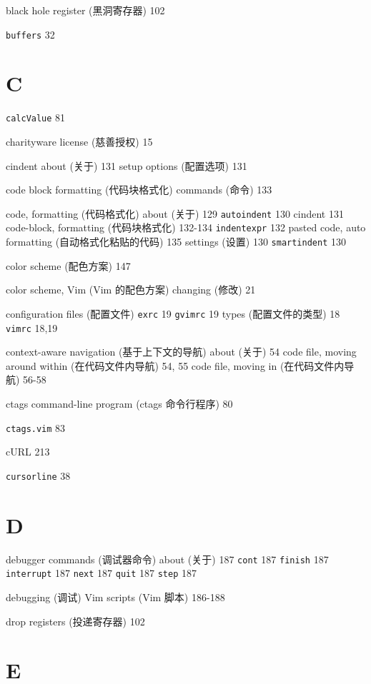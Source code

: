 black hole register (黑洞寄存器) 102

\texttt{buffers} 32

\section{C}

\texttt{calcValue} 81

charityware license (慈善授权) 15

cindent
  about (关于) 131
  setup options (配置选项) 131

code block formatting (代码块格式化)
  commands (命令) 133

code, formatting (代码格式化)
  about (关于) 129
  \texttt{autoindent} 130
  cindent 131
  code-block, formatting (代码块格式化) 132-134
  \texttt{indentexpr} 132
  pasted code, auto formatting (自动格式化粘贴的代码) 135
  settings (设置) 130
  \texttt{smartindent} 130

color scheme (配色方案) 147

color scheme, Vim (Vim 的配色方案)
  changing (修改) 21

configuration files (配置文件)
  \texttt{exrc} 19
  \texttt{gvimrc} 19
  types (配置文件的类型) 18
  \texttt{vimrc} 18,19

context-aware navigation (基于上下文的导航)
  about (关于) 54
  code file, moving around within (在代码文件内导航) 54, 55
  code file, moving in (在代码文件内导航) 56-58

ctags command-line program (ctags 命令行程序) 80

\texttt{ctags.vim} 83

cURL 213

\texttt{cursorline} 38


\section{D}

debugger commands (调试器命令)
  about (关于) 187
  \texttt{cont} 187
  \texttt{finish} 187
  \texttt{interrupt} 187
  \texttt{next} 187
  \texttt{quit} 187
  \texttt{step} 187

debugging (调试)
  Vim scripts (Vim 脚本) 186-188

drop registers (投递寄存器) 102

\section{E}

